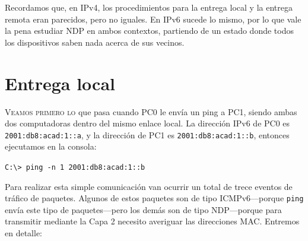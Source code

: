 \documentclass[a4paper,10pt]{corsage}
\makeatletter
\newcommand{\ipaddress}[1]{\texttt{#1}}
\newcommand{\devname}[1]{\textsc{#1}}
\newcommand*{\@doendeq}{%
	\everypar{{\setbox\z@\lastbox}\everypar{}}%
}
\newenvironment{console}{%
	\begin{tcolorbox}[
		left skip=1cm,
		right skip=1Cm,
		left=8pt,
		right=8pt,
		top=2.5\parskip,
		bottom=2\parskip,
		colback=gray!10,
		colframe=gray!40,
		boxrule=0pt,
		leftrule=4pt,
		sharp corners=all,
		fontupper=\ttfamily\flushleft\footnotesize
	]%
}{%
	\end{tcolorbox}%
	\ignorespacesafterend\par\noindent\aftergroup\@doendeq%
}
\makeatother
\begin{document}
	Recordamos que, en IPv4, los procedimientos para la entrega local y la entrega remota eran parecidos, pero no iguales.  En IPv6 sucede lo mismo, por lo que vale la pena estudiar NDP en ambos contextos, partiendo de un estado donde todos los dispositivos saben nada acerca de sus vecinos.

	\section{Entrega local}
		\lettrine{V}{eamos primero lo} que pasa cuando \devname{PC0} le envía un ping a \devname{PC1}, siendo ambas dos computadoras dentro del mismo enlace local.  La dirección IPv6 de \devname{PC0} es \ipaddress{2001:db8:acad:1::a}, y la dirección de \devname{PC1} es \ipaddress{2001:db8:acad:1::b}, entonces ejecutamos en la consola:
		\begin{console}
			\verb|C:\> ping -n 1 2001:db8:acad:1::b|
		\end{console}

		Para realizar esta simple comunicación van ocurrir un total de trece eventos de tráfico de paquetes.  Algunos de estos paquetes son de tipo ICMPv6---porque \texttt{ping} envía este tipo de paquetes---pero los demás son de tipo NDP---porque para transmitir mediante la Capa 2 necesito averiguar las direcciones MAC.  Entremos en detalle:
\end{document}
